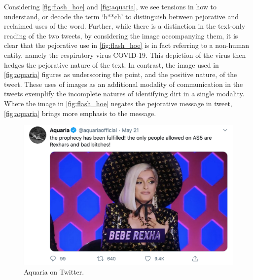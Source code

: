 Considering \autoref{fig:flash_hoe} and \autoref{fig:aquaria}, we see tensions in how to understand, or decode the term `b**ch' to distinguish between pejorative and reclaimed uses of the word. Further, while there is a distinction in the text-only reading of the two tweets, by considering the image accompanying them, it is clear that the pejorative use in \autoref{fig:flash_hoe} is in fact referring to a non-human entity, namely the respiratory virus COVID-19. This depiction of the virus then hedges the pejorative nature of the text. In contrast, the image used in \autoref{fig:aquaria} figures as underscoring the point, and the positive nature, of the tweet. These uses of images as an additional modality of communication in the tweets exemplify the incomplete natures of identifying dirt in a single modality. Where the image in \autoref{fig:flash_hoe} negates the pejorative message in tweet, \autoref{fig:aquaria} brings more emphasis to the message.

\begin{figure}[!h]
  \centering
  \includegraphics[scale=0.5]{aquaria.png}
  \caption{Aquaria on Twitter.}
  \label{fig:aquaria}
\end{figure}

